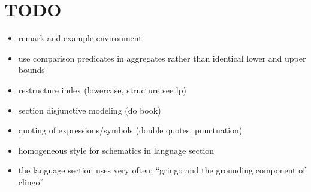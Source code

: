 \section{TODO}
\begin{itemize}
\item remark and example environment
\item use comparison predicates in aggregates rather than identical lower and upper bounds
\item restructure index (lowercase, structure see lp)
\item section disjunctive modeling (do book)
\item quoting of expressions/symbols (double quotes, punctuation)
\item homogeneous style for schematics in language section
\item the language section uses very often: ``gringo and the grounding component of clingo''
  
\end{itemize}


